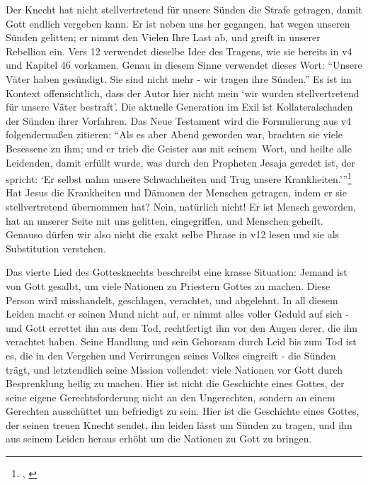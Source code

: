 Der Knecht hat nicht stellvertretend für unsere Sünden die Strafe getragen, damit Gott endlich vergeben kann.
Er ist neben uns her gegangen, hat wegen unseren Sünden gelitten; er nimmt den Vielen Ihre Last ab, und greift in unserer Rebellion ein.
Vers 12 verwendet dieselbe Idee des Tragens, wie sie bereits in v4 und Kapitel 46 vorkamen.
Genau in diesem Sinne verwendet  dieses Wort: ``Unsere Väter haben gesündigt. Sie sind nicht mehr - wir tragen ihre Sünden.''
Es ist im Kontext offensichtlich, dass der Autor hier nicht mein `wir wurden stellvertretend für unsere Väter bestraft'.
Die aktuelle Generation im Exil ist Kollateralschaden der Sünden ihrer Vorfahren.
Das Neue Testament wird die Formulierung aus v4 folgendermaßen zitieren:
``Als es aber Abend geworden war, brachten sie viele Besessene zu ihm;
und er trieb die Geister aus mit \textlangle seinem\textrangle\  Wort, und heilte alle Leidenden, damit erfüllt wurde, was durch den Propheten Jesaja geredet ist,
der spricht: `Er selbst nahm unsere Schwachheiten und Trug unsere Krankheiten.'''\footnote{, \Cite{elb}}
Hat Jesus die Krankheiten und Dämonen der Menschen getragen, indem er sie stellvertretend übernommen hat?
Nein, natürlich nicht! Er ist Mensch geworden, hat an unserer Seite mit uns gelitten, eingegriffen, und Menschen geheilt.
Genauso dürfen wir also nicht die exakt selbe Phrase in v12 lesen und sie als Substitution verstehen.

Das vierte Lied des Gottesknechts beschreibt eine krasse Situation:
Jemand ist von Gott gesalbt, um viele Nationen zu Priestern Gottes zu machen.
Diese Person wird misshandelt, geschlagen, verachtet, und abgelehnt.
In all diesem Leiden macht er seinen Mund nicht auf, er nimmt alles voller Geduld auf sich - und Gott errettet ihn aus dem Tod,
rechtfertigt ihn vor den Augen derer, die ihn verachtet haben.
Seine Handlung und sein Gehorsam durch Leid bis zum Tod ist es, die in den Vergehen und Verirrungen seines Volkes eingreift - die Sünden trägt, und letztendlich seine Mission vollendet:
viele Nationen vor Gott durch Besprenklung heilig zu machen.
Hier ist nicht die Geschichte eines Gottes, der seine eigene Gerechtsforderung nicht an den Ungerechten, sondern an einem Gerechten ausschüttet um befriedigt zu sein.
Hier ist die Geschichte eines Gottes, der seinen treuen Knecht sendet, ihn leiden lässt um Sünden zu tragen, und ihn aus seinem Leiden heraus erhöht um die Nationen zu Gott zu bringen.


